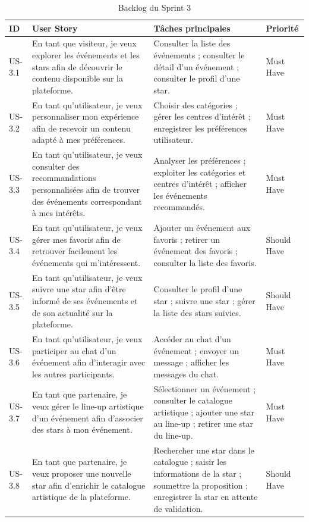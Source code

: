 \begin{table}[H]
\centering
\caption{Backlog du Sprint 3}
\label{tableau:5-1}
\renewcommand{\arraystretch}{1.2}
\begin{tabularx}{\textwidth}{|>{\raggedright\arraybackslash}X|>{\raggedright\arraybackslash}X|>{\raggedright\arraybackslash}X|>{\raggedright\arraybackslash}X|}
\hline
\rowcolor[HTML]{ECF4FF}
\textbf{ID} & \textbf{User Story} & \textbf{Tâches principales} & \textbf{Priorité} \\
\hline
US-3.1 & En tant que visiteur, je veux explorer les événements et les stars afin de découvrir le contenu disponible sur la plateforme. & Consulter la liste des événements ; consulter le détail d’un événement ; consulter le profil d’une star. & Must Have \\
\hline
US-3.2 & En tant qu’utilisateur, je veux personnaliser mon expérience afin de recevoir un contenu adapté à mes préférences. & Choisir des catégories ; gérer les centres d’intérêt ; enregistrer les préférences utilisateur. & Must Have \\
\hline
US-3.3 & En tant qu’utilisateur, je veux consulter des recommandations personnalisées afin de trouver des événements correspondant à mes intérêts. & Analyser les préférences ; exploiter les catégories et centres d’intérêt ; afficher les événements recommandés. & Must Have \\
\hline
US-3.4 & En tant qu’utilisateur, je veux gérer mes favoris afin de retrouver facilement les événements qui m’intéressent. & Ajouter un événement aux favoris ; retirer un événement des favoris ; consulter la liste des favoris. & Should Have \\
\hline
US-3.5 & En tant qu’utilisateur, je veux suivre une star afin d’être informé de ses événements et de son actualité sur la plateforme. & Consulter le profil d’une star ; suivre une star ; gérer la liste des stars suivies. & Should Have \\
\hline
US-3.6 & En tant qu’utilisateur, je veux participer au chat d’un événement afin d’interagir avec les autres participants. & Accéder au chat d’un événement ; envoyer un message ; afficher les messages du chat. & Must Have \\
\hline
US-3.7 & En tant que partenaire, je veux gérer le line-up artistique d’un événement afin d’associer des stars à mon événement. & Sélectionner un événement ; consulter le catalogue artistique ; ajouter une star au line-up ; retirer une star du line-up. & Must Have \\
\hline
US-3.8 & En tant que partenaire, je veux proposer une nouvelle star afin d’enrichir le catalogue artistique de la plateforme. & Rechercher une star dans le catalogue ; saisir les informations de la star ; soumettre la proposition ; enregistrer la star en attente de validation. & Should Have \\

\end{tabularx}
\end{table}
